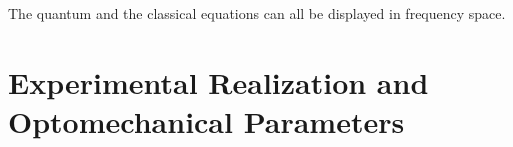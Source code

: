 \documentclass[8pt,a4paper,twocolumn]{article} %
\numberwithin{equation}{section} %
\begin{document}
			The quantum and the classical equations can all be displayed in frequency space.







	\section{Experimental Realization and Optomechanical Parameters} %
	\label{sec:experimental_realization}
		



\end{document}
